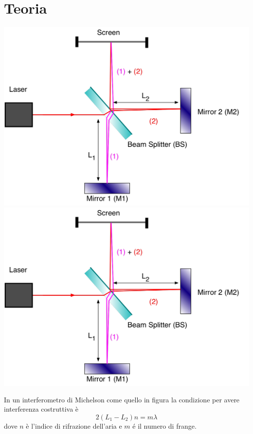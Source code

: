 \documentclass[a4paper]{article}
\begin{document}
\section{Teoria}
\begin{center}
	\begin{minipage}[c]{.50\textwidth}
		\centering
		\includegraphics[width=1\textwidth]{michelson.png}
		\includegraphics[width=1\textwidth]{teoria_michelson.png}
	\end{minipage}
	\begin{minipage}[c]{.40\textwidth}
		In un interferometro di Michelson come quello in figura la condizione per avere interferenza costruttiva è \[2(L_1 -L_2)n = m \lambda\] dove $n$ è l'indice di rifrazione dell'aria e $m$ é il numero di frange.
	\end{minipage}
\end{center}
\end{document}
